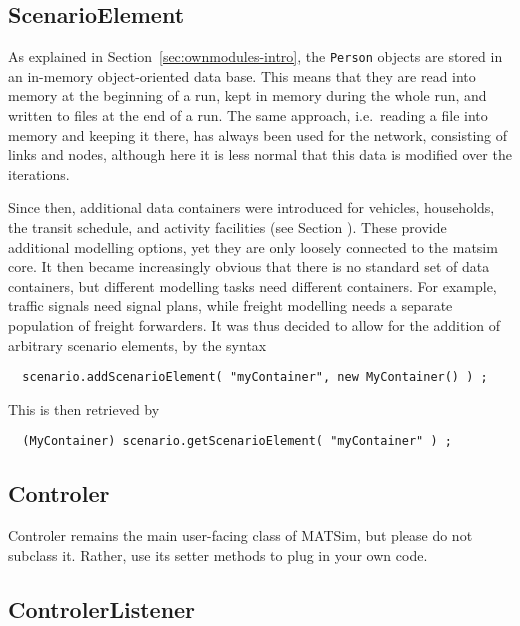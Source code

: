 \subsection{ScenarioElement}

As explained in Section~\ref{sec:ownmodules-intro}, the \lstinline$Person$ objects are stored in an in-memory object-oriented data base.  This means that they are read into memory at the beginning of a run, kept in memory during the whole run, and written to files at the end of a run.
%
The same approach, i.e.\ reading a file into memory and keeping it there, has always been used for the network, consisting of links and nodes, although here it is less normal that this data is modified over the iterations.

Since then, additional data containers were introduced for vehicles, households, the transit schedule, and activity facilities (see Section ).  These provide additional modelling options, yet they are only loosely connected to the \acrshort{matsim} core.  It then became increasingly obvious that there is no standard set of data containers, but different modelling tasks need different containers.  For example, traffic signals need signal plans, while freight modelling needs a separate population of freight forwarders.  It was thus decided to allow for the addition of arbitrary scenario elements, by the syntax
\begin{lstlisting}
  scenario.addScenarioElement( "myContainer", new MyContainer() ) ;
\end{lstlisting}
This is then retrieved by
\begin{lstlisting}
  (MyContainer) scenario.getScenarioElement( "myContainer" ) ;
\end{lstlisting}

\subsection{Controler}
\label{sec:controlerextension}
Controler remains the main user-facing class of MATSim, but please do not subclass it. Rather,
use its setter methods to plug in your own code.

\subsection{ControlerListener}
\label{sec:controlerListener-extension-point}


